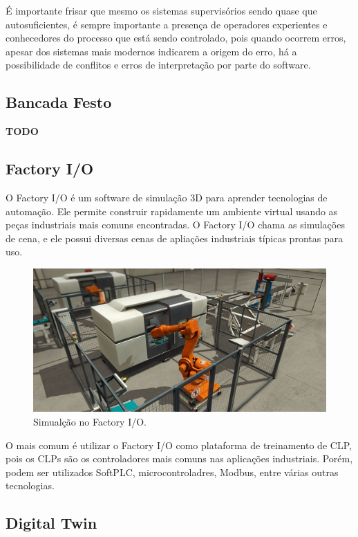 \documentclass[a4paper, 12pt]{article}
\begin{document}
		É importante frisar que mesmo os sistemas supervisórios sendo quase que autosuficientes, é sempre
		importante a presença de operadores experientes e conhecedores do processo que está sendo controlado,
		pois quando ocorrem erros, apesar dos sistemas mais modernos indicarem a origem do erro, 
		há a possibilidade de conflitos e erros de interpretação por parte do software.

	\subsection{Bancada Festo}
	
		\textbf{TODO}
	
	\subsection{Factory I/O}
	
		O Factory I/O é um software de simulação 3D para aprender tecnologias de automação.
		Ele permite construir rapidamente um ambiente virtual usando as peças industriais
		mais comuns encontradas. O Factory I/O chama as simulações de cena, e ele possui diversas cenas de 
		apliações industriais típicas prontas para uso.		
		
		\begin{figure}[H]
			\centering
			\includegraphics[scale=0.4]{figures/factory_io_1.jpg}
			\caption{Simualção no Factory I/O.}
			\label{fig:factory_simulation}
		\end{figure}
		
		O mais comum é utilizar o Factory I/O como plataforma de treinamento de CLP, pois
		os CLPs são os controladores mais comuns nas aplicações industriais. Porém, podem
		ser utilizados SoftPLC, microcontroladres, Modbus, entre várias outras tecnologias.
	
	\subsection{Digital Twin}
	
\end{document}
